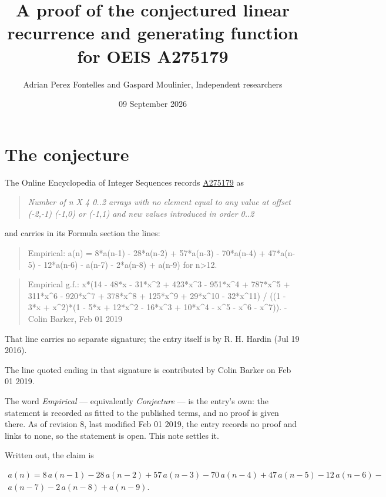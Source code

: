 \documentclass[11pt]{article}
\title{A proof of the conjectured linear recurrence and generating function for OEIS A275179}
\author{Adrian Perez Fontelles and Gaspard Moulinier, Independent researchers}
\date{09 September 2026}
\theoremstyle{definition}
\begin{document}
\maketitle
\section{The conjecture}

The Online Encyclopedia of Integer Sequences records \href{https://oeis.org/A275179}{A275179} as

\begin{quote}\itshape Number of n X 4 0..2 arrays with no element equal to any value at offset (-2,-1) (-1,0) or (-1,1) and new values introduced in order 0..2\end{quote}

and carries in its Formula section the lines:

\begin{quote}\ttfamily Empirical: a(n) = 8*a(n-1) - 28*a(n-2) + 57*a(n-3) - 70*a(n-4) + 47*a(n-5) - 12*a(n-6) - a(n-7) - 2*a(n-8) + a(n-9) for n>12.\end{quote}

\begin{quote}\ttfamily Empirical g.f.: x*(14 - 48*x - 31*x\textasciicircum{}2 + 423*x\textasciicircum{}3 - 951*x\textasciicircum{}4 + 787*x\textasciicircum{}5 + 311*x\textasciicircum{}6 - 920*x\textasciicircum{}7 + 378*x\textasciicircum{}8 + 125*x\textasciicircum{}9 + 29*x\textasciicircum{}10 - 32*x\textasciicircum{}11) / ((1 - 3*x + x\textasciicircum{}2)*(1 - 5*x + 12*x\textasciicircum{}2 - 16*x\textasciicircum{}3 + 10*x\textasciicircum{}4 - x\textasciicircum{}5 - x\textasciicircum{}6 - x\textasciicircum{}7)). - Colin Barker, Feb 01 2019\end{quote}

That line carries no separate signature; the entry itself is by R. H. Hardin (Jul 19 2016).

The line quoted ending in that signature is contributed by Colin Barker on Feb 01 2019.

The word {\itshape Empirical} --- equivalently {\itshape Conjecture} --- is the entry's own: the statement is recorded as fitted to the published terms, and no proof is given there. As of revision 8, last modified Feb 01 2019, the entry records no proof and links to none, so the statement is open. This note settles it.

Written out, the claim is

\begin{multline*} a(n) = 8\,a(n-1) - 28\,a(n-2) + 57\,a(n-3) - 70\,a(n-4) + 47\,a(n-5) - 12\,a(n-6) - \\ a(n-7) - 2\,a(n-8) + a(n-9). \end{multline*}
\end{document}
